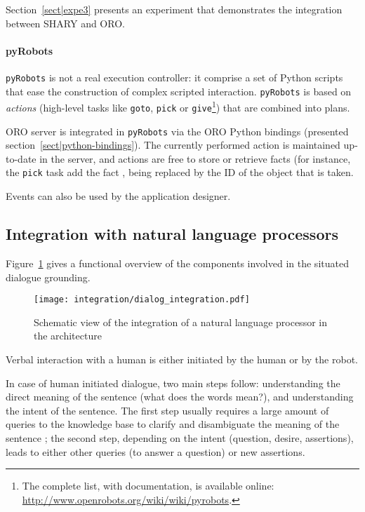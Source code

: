 Section~\ref{sect|expe3} presents an experiment that demonstrates the
integration between SHARY and ORO.

\paragraph{pyRobots} {\tt pyRobots} is not a real execution controller: it
comprise a set of Python scripts that ease the construction of complex scripted
interaction. {\tt pyRobots} is based on \emph{actions} (high-level tasks like
{\tt goto}, {\tt pick} or {\tt give}\footnote{The complete list, with
documentation, is available online:
\url{http://www.openrobots.org/wiki/wiki/pyrobots}.}) that are combined into
plans.

ORO server is integrated in {\tt pyRobots} via the ORO Python bindings
(presented section~\ref{sect|python-bindings}). The currently performed action
is maintained up-to-date in the server, and actions are free to store or
retrieve facts (for instance, the {\tt pick} task add the fact ,  being replaced by the ID of the object
that is taken.

Events can also be used by the application designer.


\subsection{Integration with natural language processors}

Figure~\ref{fig|dialog-integration} gives a functional overview of the
components involved in the situated dialogue grounding.

\begin{figure}
    \centering
    \texttt{[image: integration/dialog\_integration.pdf]}
    \caption{Schematic view of the integration of a natural language processor
    in the architecture}
    \label{fig|dialog-integration}
\end{figure}

Verbal interaction with a human is either initiated by the human or by the robot.

In case of human initiated dialogue, two main steps follow: understanding the
direct meaning of the sentence (what does the words mean?), and understanding
the intent of the sentence. The first step usually requires a large amount of
queries to the knowledge base to clarify and disambiguate the meaning of the
sentence ; the second step, depending on the intent (question, desire,
assertions), leads to either other queries (to answer a question) or new
assertions.

